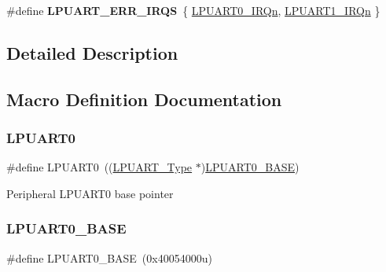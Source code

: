 \begin{DoxyCompactItemize}
\item 
\mbox{\label{group___l_p_u_a_r_t___peripheral___access___layer_ga0b9ebfdd9c22de9f1be5874d60def757}} 
\#define {\bfseries L\+P\+U\+A\+R\+T\+\_\+\+E\+R\+R\+\_\+\+I\+R\+QS}~\{ \mbox{\hyperlink{group___interrupt__vector__numbers_gga666eb0caeb12ec0e281415592ae89083a4a7d033e6cb46a64b460f9c2383e681e}{L\+P\+U\+A\+R\+T0\+\_\+\+I\+R\+Qn}}, \mbox{\hyperlink{group___interrupt__vector__numbers_gga666eb0caeb12ec0e281415592ae89083af5ac0e39fc168694d2b7d39018c6cc0a}{L\+P\+U\+A\+R\+T1\+\_\+\+I\+R\+Qn}} \}
\end{DoxyCompactItemize}


\subsection{Detailed Description}


\subsection{Macro Definition Documentation}
\mbox{\label{group___l_p_u_a_r_t___peripheral___access___layer_ga5b2895bb50a19a21ddb954c28977629b}} 
\subsubsection{\texorpdfstring{LPUART0}{LPUART0}}
{\footnotesize\ttfamily \#define L\+P\+U\+A\+R\+T0~((\mbox{\hyperlink{struct_l_p_u_a_r_t___type}{L\+P\+U\+A\+R\+T\+\_\+\+Type}} $\ast$)\mbox{\hyperlink{group___l_p_u_a_r_t___peripheral___access___layer_ga8d65c662026d150cdf0aa1e586fde2cb}{L\+P\+U\+A\+R\+T0\+\_\+\+B\+A\+SE}})}

Peripheral L\+P\+U\+A\+R\+T0 base pointer \mbox{\label{group___l_p_u_a_r_t___peripheral___access___layer_ga8d65c662026d150cdf0aa1e586fde2cb}} 
\subsubsection{\texorpdfstring{LPUART0\_BASE}{LPUART0\_BASE}}
{\footnotesize\ttfamily \#define L\+P\+U\+A\+R\+T0\+\_\+\+B\+A\+SE~(0x40054000u)}

